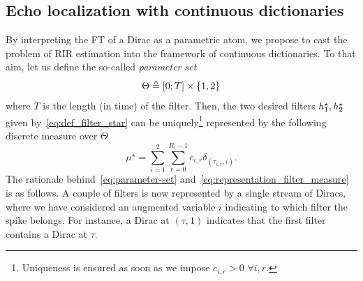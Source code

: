 \subsection{Echo localization with continuous dictionaries}

By interpreting the FT of a Dirac as a parametric atom, we propose to cast the problem of RIR estimation into the framework of continuous dictionaries.
To that aim, let us define the so-called \emph{parameter set}
\begin{equation}
    \label{eq:parameter-set}
    \Theta \triangleq \kintervcc{0}{T} \times \kbrace{1, 2}
\end{equation}
where $T$ is the length (in time) of the filter.
Then, the two desired filters  $h_1^\star,h_2^\star$ given  by~\eqref{eq:def_filter_star} can be uniquely\footnote{Uniqueness is ensured as soon as we impose $c_{i,r}>0$ $\forall i,r$.} represented by the following discrete measure over $\Theta$
\begin{equation}
    \label{eq:representation_filter_measure}
    \mu^\star = \sum_{i=1}^{2} \sum_{r=0}^{R_{i}-1} c_{i,r} \delta_{(\tau_{i,r}, i)}.
\end{equation}
The rationale behind~\eqref{eq:parameter-set}  and~\eqref{eq:representation_filter_measure} is as follows.
A couple of filters is now represented by a single stream of Diracs, where we have considered an augmented variable $i$ indicating to which filter the spike belongs.
For instance, a Dirac at $(\tau, 1)$ indicates that the first filter contains a Dirac at $\tau$.


